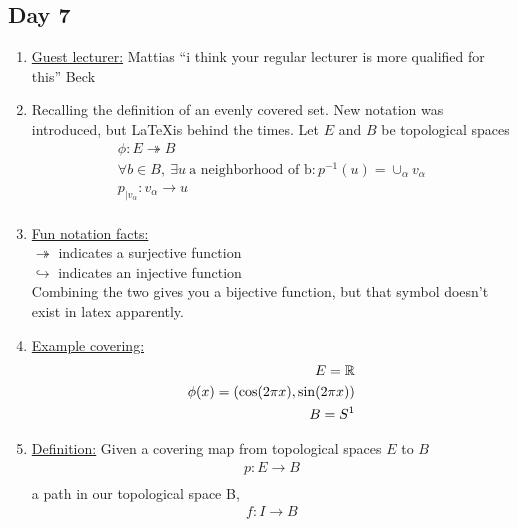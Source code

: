 \subsection{Day 7}
    \begin{enumerate}
        \item \underline{Guest lecturer:} Mattias ``i think your regular lecturer is more qualified for this'' Beck\\
        \item Recalling the definition of an evenly covered set. New notation was introduced, but
            \LaTeX is behind the times.
            Let $E$ and $B$ be topological spaces
            \begin{align*}
                \phi:E \twoheadrightarrow B\\
                \forall b \in B,\ \exists u\ \text{a neighborhood of b}: p^{-1}(u)=\cup_{\alpha}v_\alpha\\
                p_{|v_{\alpha}}: v_{\alpha}\rightarrow u\\
            \end{align*}
        \item \underline{Fun notation facts:}\\
            $\twoheadrightarrow$ indicates a surjective function\\
            $\hookrightarrow$ indicates an injective function\\
            Combining the two gives you a bijective function, but that symbol doesn't exist
            in latex apparently.
        \item \underline{Example covering:}
            \begin{align*}
                E=\mathbb{R}\\
                \phi(x)=(\cos(2\pi x), \sin(2\pi x))\\
                B=S^{1}\\
            \end{align*}
        \item \underline{Definition:} Given a covering map from topological
            spaces $E$ to $B$
            \begin{align*}
                p: E\rightarrow B\\
            \end{align*}
                a path in our topological space B,
            \begin{align*}
                f: I \rightarrow B\\

\end{align*}
\end{enumerate}

